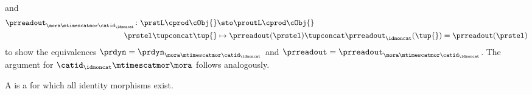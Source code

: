 \begin{example}
\begin{equation*}
\begin{aligned}
        \end{aligned}
    \end{equation*}
    and
    \begin{equation*}
        \begin{aligned}
            \prreadout_{\mora \mtimescatmor\catid_\idmoncat}\colon \prstL \cprod \cObj{} & \sto \proutL \cprod \cObj{} \\
            \prstel \tupconcat \tup{}                                                    & \mapsto \prreadout(\prstel)\tupconcat \prreadout_\idmoncat(\tup{})=\prreadout(\prstel)
        \end{aligned}
    \end{equation*}
    to show the equivalences $\prdyn=\prdyn_{\mora \mtimescatmor \catid_\idmoncat}$ and $\prreadout=\prreadout_{\mora \mtimescatmor \catid_\idmoncat}$.
    The argument for $\catid_\idmoncat \mtimescatmor \mora$ follows analogously.
\end{example}

\begin{ctdefinition}
    \label{def:strict-monoidal-stacking-cat}
    A  is a  for which all identity morphisms exist.
\end{ctdefinition}


